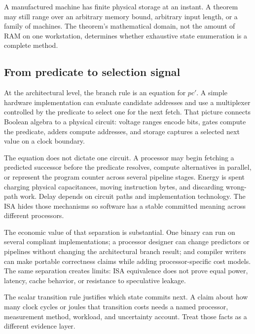 \begin{sidebar}[title={Finite hardware and an unbounded theorem are compatible}]
A manufactured machine has finite physical storage at an instant. A theorem
may still range over an arbitrary memory bound, arbitrary input length, or a
family of machines. The theorem's mathematical domain, not the amount of RAM
on one workstation, determines whether exhaustive state enumeration is a
complete method.
\end{sidebar}

\subsection{From predicate to selection signal}

At the architectural level, the branch rule is an equation for \(pc'\). A
simple hardware implementation can evaluate candidate addresses and use a
multiplexer controlled by the predicate to select one for the next fetch.
That picture connects Boolean algebra to a physical circuit: voltage ranges
encode bits, gates compute the predicate, adders compute addresses, and storage
captures a selected next value on a clock boundary.

The equation does not dictate one circuit. A processor may begin fetching a
predicted successor before the predicate resolves, compute alternatives in
parallel, or represent the program counter across several pipeline stages.
Energy is spent charging physical capacitances, moving instruction bytes, and
discarding wrong-path work. Delay depends on circuit paths and implementation
technology. The ISA hides those mechanisms so software has a stable committed
meaning across different processors.

The economic value of that separation is substantial. One binary can run on
several compliant implementations; a processor designer can change predictors
or pipelines without changing the architectural branch result; and compiler
writers can make portable correctness claims while adding processor-specific
cost models. The same separation creates limits: ISA equivalence does not prove
equal power, latency, cache behavior, or resistance to speculative leakage.

\begin{warning}[title={Do not put a cycle count into an architectural theorem}]
The scalar transition rule justifies which state commits next. A claim about
how many clock cycles or joules that transition costs needs a named processor,
measurement method, workload, and uncertainty account. Treat those facts as a
different evidence layer.
\end{warning}

